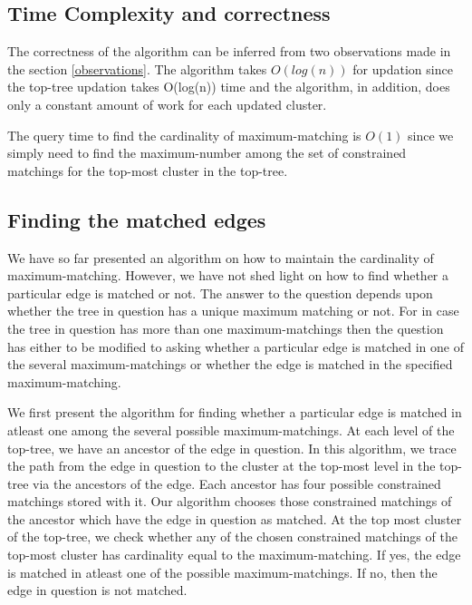 \documentclass[a4paper,12pt]{article}
\begin{document}
\subsection{Time Complexity and correctness}
The correctness of the algorithm can be inferred from two observations made in the section \ref{observations}. The algorithm takes $O(log(n))$ for updation since the top-tree updation takes O(log(n)) time and the algorithm, in addition, does only a constant amount of work for each updated cluster.

The query time to find the cardinality of maximum-matching is $O(1)$ since we simply need to find the maximum-number among the set of constrained matchings for the top-most cluster in the top-tree.

\subsection{Finding the matched edges}
We have so far presented an algorithm on how to maintain the cardinality of maximum-matching. However, we have not shed light on how to find whether a particular edge is matched or not. The answer to the question depends upon whether the tree in question has a unique maximum matching or not. For in case the tree in question has more than one maximum-matchings then the question has either to be modified to asking whether a particular edge is matched in one of the several maximum-matchings or whether the edge is matched in the specified maximum-matching.

We first present the algorithm for finding whether a particular edge is matched in atleast one among the several possible maximum-matchings. At each level of the top-tree, we have an ancestor of the edge in question. In this algorithm, we trace the path from the edge in question to the cluster at the top-most level in the top-tree via the ancestors of the edge. Each ancestor has four possible constrained matchings stored with it. Our algorithm chooses those constrained matchings of the ancestor which have the edge in question as matched. At the top most cluster of the top-tree, we check whether any of the chosen constrained matchings of the top-most cluster has cardinality equal to the maximum-matching. If yes, the edge is matched in atleast one of the possible maximum-matchings. If no, then the edge in question is not matched.
\end{document}

